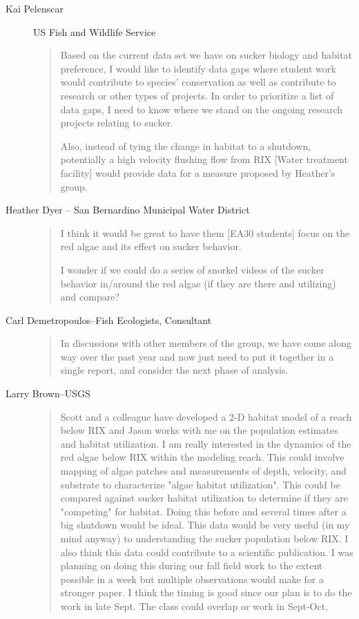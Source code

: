 \documentclass{tufte-handout}\usepackage[]{graphicx}\usepackage[]{color}
\begin{document}
\begin{description}
  \item[Kai Pelenscar]US Fish and Wildlife Service
  \begin{quote}
Based on the current data set we have on sucker biology and habitat preference, I would like to identify data gaps where student work would contribute to species' conservation as well as contribute to research or other types of projects. In order to prioritize a list of data gaps, I need to know where we stand on the ongoing research projects relating to sucker.

Also, instead of tying the change in habitat to a shutdown, potentially a high velocity flushing flow from RIX [Water treatment facility] would provide data for a measure proposed by Heather's group. 
\end{quote}

\item[Heather Dyer -- San Bernardino Municipal Water District]

\begin{quote}
I think it would be great to have them [EA30 students] focus on the red algae and its effect on sucker behavior.  

I wonder if we could do a series of snorkel videos of the sucker behavior in/around the red algae (if they are there and utilizing) and compare?

\end{quote}

\item[Carl Demetropoulos--Fish Ecologists, Consultant]

\begin{quote}
In discussions with other members of the group, we have come along way over the past year and now just need to put it together in a single report, and consider the next phase of analysis.  
\end{quote}

\item[Larry Brown--USGS]

\begin{quote}
Scott and a colleague have developed a 2-D habitat model of a reach below RIX and Jason works with me on the population estimates and habitat utilization. I am really interested in the dynamics of the red algae below RIX within the modeling reach. This could involve mapping of algae patches and measurements of depth, velocity, and substrate to characterize "algae habitat utilization". This could be compared against sucker habitat utilization to determine if they are "competing" for habitat. Doing this before and several times after a big shutdown would be ideal. This data would be very useful (in my mind anyway) to understanding the sucker population below RIX. I also think this data could contribute to a scientific publication. I was planning on doing this during our fall field work to the extent possible in a week but multiple observations would make for a stronger paper. I think the timing is good since our plan is to do the work in late Sept. The class could overlap or work in Sept-Oct.
\end{quote}


\end{description}
\end{document}

